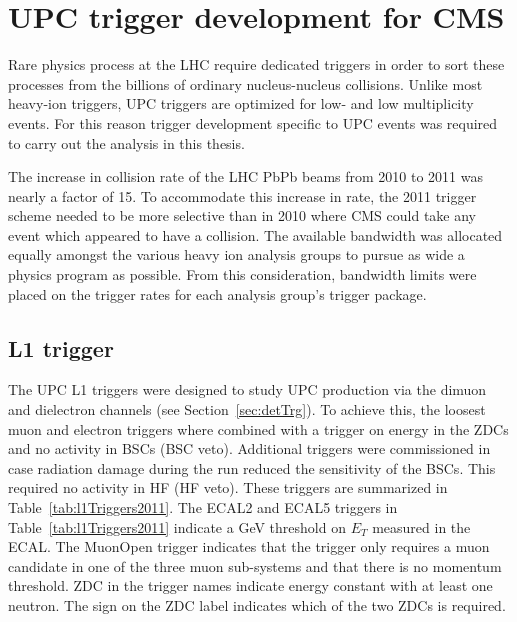 \chapter{\label{ch:trigg}UPC trigger development for CMS}
  Rare physics process at the LHC require dedicated triggers in order to sort
    these processes from the billions of ordinary nucleus-nucleus collisions. 
  Unlike most heavy-ion triggers, UPC triggers are optimized for low-\pt{} 
    and low multiplicity events. 
  For this reason trigger development specific to UPC events was required to
    carry out the analysis in this thesis.

  The increase in collision rate of the LHC PbPb beams from 2010 to 2011 was
    nearly a factor of 15. 
  To accommodate this increase in rate, the 2011 trigger scheme needed to be 
    more selective than in 2010 where CMS could take any event which 
    appeared to have a collision.
  The available bandwidth was allocated equally amongst the various heavy ion
    analysis groups to pursue as wide a physics program as possible.
  From this consideration, bandwidth limits were placed on the trigger rates
    for each analysis group's trigger package. 

  \section{\label{sec:l1Trigger}L1 trigger}
    The UPC L1 triggers were designed to study UPC \JPsi{} production via the 
      dimuon and dielectron channels (see Section~\ref{sec:detTrg}).
    To achieve this, the loosest muon and electron triggers where combined with
      a trigger on energy in the ZDCs and no activity in BSCs (BSC veto).
    Additional triggers were commissioned in case radiation damage during the 
      run reduced the sensitivity of the BSCs.
    This required no activity in HF (HF veto). 
    These triggers are summarized in Table~\ref{tab:l1Triggers2011}.
    The ECAL2 and ECAL5 triggers in Table~\ref{tab:l1Triggers2011}
      indicate a \DIFdelbegin {} \DIFaddbegin {}\DIFaddend GeV threshold on $E_{T}$ measured in the ECAL.
    The MuonOpen trigger indicates that the trigger only 
      requires a muon candidate in one of the three muon sub-systems and that
      there is no momentum threshold.
    ZDC in the trigger names indicate energy constant with at least one neutron.
    The sign on the ZDC label indicates which of the two ZDCs is required. 

